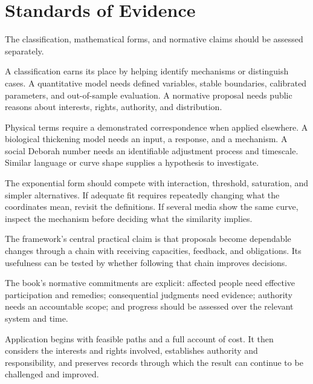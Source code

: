 \section{Standards of Evidence}

The classification, mathematical forms, and normative claims should be assessed separately.

A classification earns its place by helping identify mechanisms or distinguish cases. A quantitative model needs defined variables, stable boundaries, calibrated parameters, and out-of-sample evaluation. A normative proposal needs public reasons about interests, rights, authority, and distribution.

Physical terms require a demonstrated correspondence when applied elsewhere. A biological thickening model needs an input, a response, and a mechanism. A social Deborah number needs an identifiable adjustment process and timescale. Similar language or curve shape supplies a hypothesis to investigate.

The exponential form should compete with interaction, threshold, saturation, and simpler alternatives. If adequate fit requires repeatedly changing what the coordinates mean, revisit the definitions. If several media show the same curve, inspect the mechanism before deciding what the similarity implies.

The framework's central practical claim is that proposals become dependable changes through a chain with receiving capacities, feedback, and obligations. Its usefulness can be tested by whether following that chain improves decisions.

The book's normative commitments are explicit: affected people need effective participation and remedies; consequential judgments need evidence; authority needs an accountable scope; and progress should be assessed over the relevant system and time.

Application begins with feasible paths and a full account of cost. It then considers the interests and rights involved, establishes authority and responsibility, and preserves records through which the result can continue to be challenged and improved.
